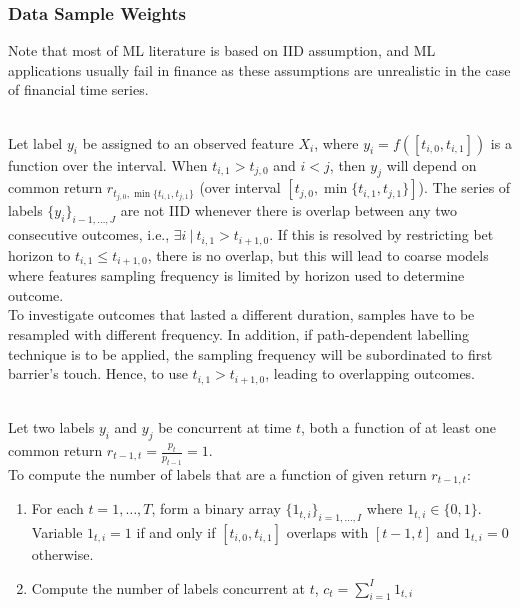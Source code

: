 \subsubsection{Data Sample Weights}

Note that most of ML literature is based on IID assumption, and ML applications usually fail in finance as these assumptions are unrealistic in the case of financial time series.

\begin{remark} \\
Let label $y_i$ be assigned to an observed feature $X_i$, where $y_i = f([t_{i,0}, t_{i,1}])$ is a function over the interval. When $t_{i,1} > t_{j,0}$ and $i < j$, then $y_j$ will depend on common return $r_{t_{j,0}, \min\{t_{i,1}, t_{j,1}\}}$ (over interval $[t_{j,0}, \min\{t_{i,1}, t_{j,1}\}]$). The series of labels $\{y_i \}_{i-1, \ldots, J}$ are not IID whenever there is overlap between any two consecutive outcomes, i.e., $\exists i \ \vert \ t_{i,1} > t_{i+1, 0}$. If this is resolved by restricting bet horizon to $t_{i,1} \leq t_{i+1, 0}$, there is no overlap, but this will lead to coarse models where features sampling frequency is limited by horizon used to determine outcome.\\
To investigate outcomes that lasted a different duration, samples have to be resampled with different frequency. In addition, if path-dependent labelling technique is to be applied, the sampling frequency will be subordinated to first barrier's touch. Hence, to use $t_{i,1} > t_{i+1, 0}$, leading to overlapping outcomes.
\end{remark}

\begin{method} \\
Let two labels $y_i$ and $y_j$ be concurrent at time $t$, both a function of at least one common return $r_{t-1, t} = \frac{p_t}{p_{t-1}} = 1$.\\
To compute the number of labels that are a function of given return $r_{t-1, t}$:
\begin{enumerate}[label=\roman*.]
\setlength{\itemsep}{0pt}
\item For each $t = 1, \ldots, T$, form a binary array $\{1_{t,i}\}_{i=1, \ldots, I}$ where $1_{t, i} \in \{0,1 \}$.\\
Variable $1_{t,i} = 1$ if and only if $[t_{i,0}, t_{i,1}]$ overlaps with $[t-1, t]$ and $1_{t,i}=0$ otherwise.
\item Compute the number of labels concurrent at $t$, $c_t = \sum\limits_{i=1}^I 1_{t,i}$
\end{enumerate}
\end{method}

